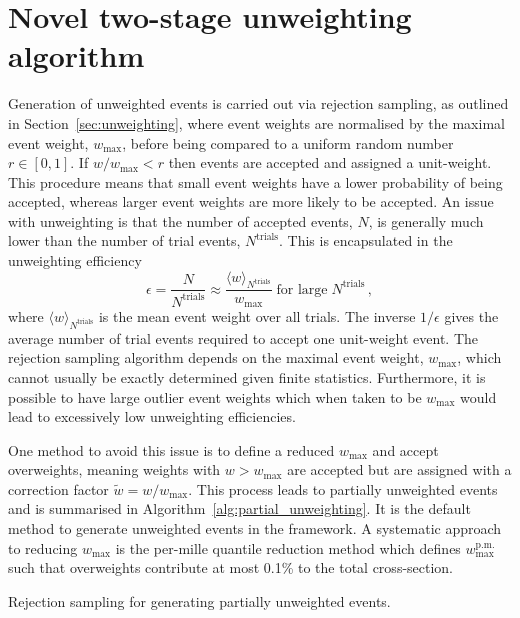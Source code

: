 \documentclass[main.tex]{subfiles}
\begin{document}
\section{Novel two-stage unweighting algorithm}\label{sec:twostep}
Generation of unweighted events is carried out via rejection sampling,
as outlined in Section~\ref{sec:unweighting}, where event weights
are normalised by the maximal event weight, $w_{\mathrm{max}}$,
before being compared to a uniform random number $r \in [0,1]$. If
$w / w_{\mathrm{max}} < r$ then events are accepted and assigned
a unit-weight. This procedure means that small event weights
have a lower probability of being accepted, whereas larger event weights
are more likely to be accepted. An issue with unweighting is that
the number of accepted events, $N$, is generally much lower than the
number of trial events, $N^{\mathrm{trials}}$. This is encapsulated in
the unweighting efficiency
\begin{equation}
    \epsilon = \dfrac{N}{N^{\mathrm{trials}}} \approx \dfrac{\langle w \rangle_{N^{\mathrm{trials}}}}{w_{\mathrm{max}}} \; \text{for large} \; N^{\mathrm{trials}} \, ,
    \label{eqn:pp_unweighting_efficiency}
\end{equation}
where $\langle w \rangle_{N^{\mathrm{trials}}}$ is the mean event weight
over all trials. The inverse $1 / \epsilon$ gives the average number of
trial events required to accept one unit-weight event. The rejection
sampling algorithm depends
on the maximal event weight, $w_{\mathrm{max}}$, which cannot usually be
exactly determined given finite statistics. Furthermore, it is possible to
have large outlier event weights which when taken to be $w_{\mathrm{max}}$ would
lead to excessively low unweighting efficiencies.

One method to avoid this issue is to define a reduced $w_{\mathrm{max}}$
and accept overweights, meaning weights with $w > w_{\mathrm{max}}$
are accepted but are assigned with a correction factor
$\tilde{w} = w / w_{\mathrm{max}}$.
This process leads to partially
unweighted events and is summarised in Algorithm~\ref{alg:partial_unweighting}.
It is the default method to generate unweighted events in the {\Sherpa}
framework.
A systematic approach to reducing $w_{\mathrm{max}}$
is the per-mille quantile reduction method which defines $w_{\mathrm{max}}^{\mathrm{p.m.}}$
such that overweights contribute at most 0.1\% to the total cross-section.

\begin{algorithm}
    \caption{Rejection sampling for generating partially unweighted events.}
    \label{alg:partial_unweighting}
\end{algorithm}
\end{document}
